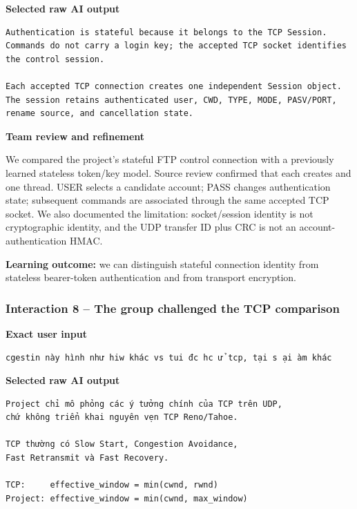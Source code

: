 \textbf{Selected raw AI output}

\begin{lstlisting}
Authentication is stateful because it belongs to the TCP Session.
Commands do not carry a login key; the accepted TCP socket identifies
the control session.

Each accepted TCP connection creates one independent Session object.
The session retains authenticated user, CWD, TYPE, MODE, PASV/PORT,
rename source, and cancellation state.
\end{lstlisting}

\textbf{Team review and refinement}

We compared the project's stateful FTP control connection with a previously
learned stateless token/key model. Source review confirmed that each
 creates  and one thread. USER
selects a candidate account; PASS changes authentication state; subsequent
commands are associated through the same accepted TCP socket. We also
documented the limitation: socket/session identity is not cryptographic
identity, and the UDP transfer ID plus CRC is not an account-authentication
HMAC.

\textbf{Learning outcome:} we can distinguish stateful connection identity
from stateless bearer-token authentication and from transport encryption.

\subsubsection{Interaction 8 -- The group challenged the TCP comparison}

\sourceB

\textbf{Exact user input}

\begin{lstlisting}
cgestin này hình như hiw khác vs tui đc hc ử tcp, tại s ại àm khác
\end{lstlisting}

\textbf{Selected raw AI output}

\begin{lstlisting}
Project chỉ mô phỏng các ý tưởng chính của TCP trên UDP,
chứ không triển khai nguyên vẹn TCP Reno/Tahoe.

TCP thường có Slow Start, Congestion Avoidance,
Fast Retransmit và Fast Recovery.

TCP:     effective_window = min(cwnd, rwnd)
Project: effective_window = min(cwnd, max_window)
\end{lstlisting}

